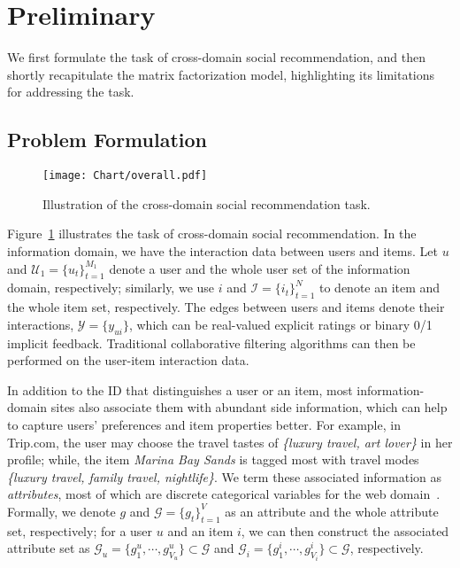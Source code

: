 \documentclass[sigconf]{acmart}
\newcommand{\Set}[1]{\mathcal{#1}}
\begin{document}
\section{Preliminary}
We first formulate the task of cross-domain social recommendation, and then shortly recapitulate the matrix factorization model, highlighting its limitations for addressing the task.
\subsection{Problem Formulation}
\begin{figure}
	\centering
\texttt{[image: Chart/overall.pdf]}\\
	\vspace{-5pt}
	\caption{Illustration of the cross-domain social recommendation task.}\label{fig:framework}
	\vspace{-1em}
\end{figure}

Figure~\ref{fig:framework} illustrates the task of cross-domain social recommendation.
In the information domain, we have the interaction data between users and items.
Let $u$ and $\Set{U}_{1}=\{u_{t}\}_{t=1}^{M_{1}}$ denote a user and the whole user set of the information domain, respectively; similarly, we use $i$ and $\Set{I}=\{i_{t}\}_{t=1}^{N}$ to denote an item and the whole item set, respectively.
The edges between users and items denote their interactions, $\Set{Y} = \{y_{ui}\}$, which can be real-valued explicit ratings or binary 0/1 implicit feedback.
Traditional collaborative filtering algorithms can then be performed on the user-item interaction data.

In addition to the ID that distinguishes a user or an item, most information-domain sites also associate them with abundant side information, which can help to capture users' preferences and item properties better.
For example, in Trip.com, the user may choose the travel tastes of \emph{\{luxury travel, art lover\}} in her profile; while, the item \emph{Marina Bay Sands} is tagged most with travel modes \emph{\{luxury travel, family travel, nightlife\}}.
We term these associated information as \textit{attributes}, most of which are discrete categorical variables for the web domain~\cite{he2017neural}.
Formally, we denote $g$ and $\Set{G}=\{g_{t}\}_{t=1}^{V}$ as an attribute and the whole attribute set, respectively; for a user $u$ and an item $i$, we can then construct the associated attribute set as $\Set{G}_{u}=\{g^{u}_{1},\cdots,g^{u}_{V_{u}}\}\subset\Set{G}$ and $\Set{G}_{i}=\{g^{i}_{1},\cdots,g^{i}_{V_{i}}\}\subset\Set{G}$, respectively.
\end{document}
